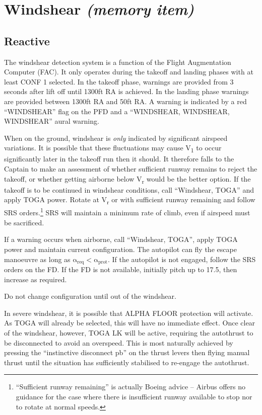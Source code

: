 \documentclass[a5paper,11pt,twoside]{book}
\newcommand{\multicite}[1]{
  \nopagebreak
  \noindent{\footnotesize\color{blue}{[ #1 ]}}
}
\newcommand{\V}[1]{V\textsubscript{#1}}
\begin{document}
\multicite{EOMB~3.80.2, QRH~AEP.MISC, FCOM~AEP.MISC, FCTM~AEP.MISC}


\section{Windshear \emph{(memory item)}}

\subsection{Reactive}

The windshear detection system is a function of the Flight Augmentation Computer
(FAC). It only operates during the takeoff and landing phases with at least CONF
1 selected. In the takeoff phase, warnings are provided from 3 seconds after
lift off until 1300ft RA is achieved. In the landing phase warnings are provided
between 1300ft RA and 50ft RA. A warning is indicated by a red “WINDSHEAR” flag
on the PFD and a “WINDSHEAR, WINDSHEAR, WINDSHEAR” aural warning.

 When on the ground, windshear is \emph{only} indicated by significant airspeed
 variations. It is possible that these fluctuations may cause \V{1} to occur
 significantly later in the takeoff run then it should. It therefore falls to
 the Captain to make an assessment of whether sufficient runway remains to
 reject the takeoff, or whether getting airborne below \V{r} would be the better
 option. If the takeoff is to be continued in windshear conditions, call
 “Windshear, TOGA” and apply TOGA power.  Rotate at \V{r} or with sufficient
 runway remaining and follow SRS orders.\footnote{“Sufficient runway remaining”
 is actually Boeing advice – Airbus offers no guidance for the case where there
 is insufficient runway available to stop nor to rotate at normal speeds.} SRS
 will maintain a minimum rate of climb, even if airspeed must be sacrificed.

If a warning occurs when airborne, call “Windshear, TOGA”, apply TOGA power and
maintain current configuration. The autopilot can fly the escape manoeuvre as
long as \mbox{$\mathrm{\alpha_{req}<\alpha_{prot}}$}. If the
autopilot is not engaged, follow the SRS orders on the FD. If the FD is not
available, initially pitch up to 17.5\textdegree, then increase as required.

Do not change configuration until out of the windshear.

In severe windshear, it is possible that ALPHA FLOOR protection will
activate. As TOGA will already be selected, this will have no immediate
effect. Once clear of the windshear, however, TOGA LK will be active, requiring
the autothrust to be disconnected to avoid an overspeed. This is most naturally
achieved by pressing the “instinctive disconnect pb” on the thrust levers then
flying manual thrust until the situation has sufficiently stabilised to
re-engage the autothrust.
\end{document}
